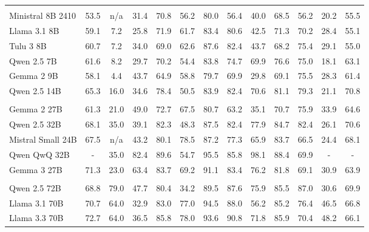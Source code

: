 \documentclass[table]{ai2style/ai2}
\begin{document}
\begin{table}[!htbp]
{\begin{tabular}{lcccccccccccc}
\rowcolor{midgrey}\multicolumn{13}{c}{\textbf{Open weights models 7-14B Parameters}} \\
\rowcolor{lightgrey}Ministral 8B 2410 & 53.5 & n/a & 31.4 & 70.8 & 56.2 & 80.0   & 56.4 & 40.0   & 68.5 & 56.2 & 20.2 & 55.5 \\
\rowcolor{lightgrey}Llama 3.1 8B & 59.1 & 7.2 & 25.8 & {71.9} & 61.7 & 83.4 & 80.6 & 42.5 & 71.3 & 70.2 & 28.4 & 55.1 \\
\rowcolor{lightgrey}Tulu 3 8B & 60.7 & 7.2 & 34.0 & 69.0 & 62.6 & {87.6} & {82.4} & 43.7 & 68.2 & 75.4 & {29.1} & 55.0 \\
\rowcolor{lightgrey}Qwen 2.5 7B & 61.6 & 8.2 & 29.7 & 70.2 & 54.4 & 83.8 & 74.7 & 69.9 & 76.6 & 75.0   & 18.1 & 63.1 \\
\rowcolor{lightgrey}Gemma 2 9B & 58.1 & 4.4 & {43.7} & 64.9   & 58.8 & 79.7 & 69.9 & 29.8 & 69.1 & 75.5 & 28.3 & 61.4 \\
\rowcolor{lightgrey}Qwen 2.5 14B & 65.3 & 16.0 & 34.6 & 78.4 & 50.5 & 83.9 & 82.4 & {70.6} & {81.1} & {79.3} & 21.1 & {70.8} \\
\rowcolor{midgrey}\multicolumn{13}{c}{\textbf{Open weights models 24-32B Parameters}} \\
\rowcolor{lightgrey} Gemma 2 27B & 61.3 & 21.0 & 49.0 & 72.7 & 67.5 & 80.7 & 63.2 & 35.1 & 70.7 & 75.9 & 33.9 & 64.6 \\
\rowcolor{lightgrey} Qwen 2.5 32B & 68.1 & 35.0 & 39.1 & 82.3 & 48.3 & 87.5 & 82.4 & 77.9 & 84.7 & 82.4 & 26.1 & 70.6 \\
\rowcolor{lightgrey} Mistral Small 24B & 67.5 & n/a & 43.2 & 80.1 & 78.5 & 87.2 & 77.3 & 65.9 & 83.7 & 66.5 & 24.4 & 68.1 \\
\rowcolor{lightgrey} Qwen QwQ 32B & - & 35.0 & 82.4 & 89.6 & 54.7 & 95.5 & 85.8 & 98.1 & 88.4 & 69.9 & - & - \\
\rowcolor{lightgrey} Gemma 3 27B & 71.3 & 23.0 & 63.4 & 83.7 & 69.2 & 91.1 & 83.4 & 76.2 & 81.8 & 69.1 & 30.9 & 63.9 \\
\rowcolor{midgrey}\multicolumn{13}{c}{\textbf{Open weights models \char126 70B Parameters}} \\
\rowcolor{lightgrey} Qwen 2.5 72B & 68.8 & 79.0 & 47.7 & 80.4 & 34.2 & 89.5 & 87.6 & 75.9 & 85.5 & 87.0 & 30.6 & 69.9 \\
\rowcolor{lightgrey} Llama 3.1 70B & 70.7 & 64.0 & 32.9 & 83.0 & 77.0 & 94.5 & 88.0 & 56.2 & 85.2 & 76.4 & 46.5 & 66.8 \\
\rowcolor{lightgrey} Llama 3.3 70B & 72.7 & 64.0 & 36.5 & 85.8 & 78.0 & 93.6 & 90.8 & 71.8 & 85.9 & 70.4 & 48.2 & 66.1 \\

\end{tabular}}
\end{table}
\end{document}
